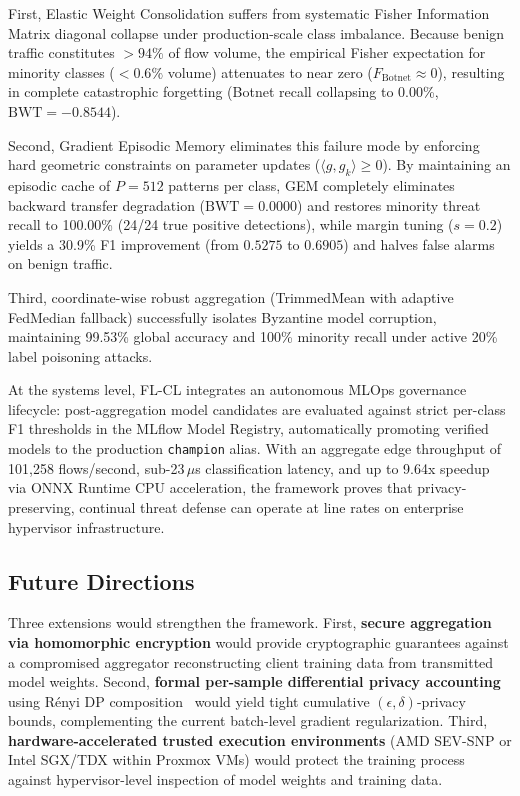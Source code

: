 \documentclass[journal,10pt,twocolumn]{IEEEtran}
\begin{document}
First, Elastic Weight Consolidation suffers from systematic Fisher Information Matrix diagonal collapse under production-scale class imbalance. Because benign traffic constitutes $>94\%$ of flow volume, the empirical Fisher expectation for minority classes ($<0.6\%$ volume) attenuates to near zero ($F_{\text{Botnet}} \approx 0$), resulting in complete catastrophic forgetting (Botnet recall collapsing to 0.00\%, $\text{BWT} = -0.8544$).

Second, Gradient Episodic Memory eliminates this failure mode by enforcing hard geometric constraints on parameter updates ($\langle g, g_k \rangle \ge 0$). By maintaining an episodic cache of $P=512$ patterns per class, GEM completely eliminates backward transfer degradation ($\text{BWT} = 0.0000$) and restores minority threat recall to 100.00\% (24/24 true positive detections), while margin tuning ($s=0.2$) yields a 30.9\% F1 improvement (from $0.5275$ to $0.6905$) and halves false alarms on benign traffic.

Third, coordinate-wise robust aggregation (TrimmedMean with adaptive FedMedian fallback) successfully isolates Byzantine model corruption, maintaining 99.53\% global accuracy and 100\% minority recall under active 20\% label poisoning attacks.

At the systems level, FL-CL integrates an autonomous MLOps governance lifecycle: post-aggregation model candidates are evaluated against strict per-class F1 thresholds in the MLflow Model Registry, automatically promoting verified models to the production \texttt{champion} alias. With an aggregate edge throughput of 101,258 flows/second, sub-23\,$\mu$s classification latency, and up to 9.64x speedup via ONNX Runtime CPU acceleration, the framework proves that privacy-preserving, continual threat defense can operate at line rates on enterprise hypervisor infrastructure.

\subsection{Future Directions}
\label{sec:future}
Three extensions would strengthen the framework. First, \textbf{secure aggregation via homomorphic encryption} would provide cryptographic guarantees against a compromised aggregator reconstructing client training data from transmitted model weights. Second, \textbf{formal per-sample differential privacy accounting} using Rényi DP composition~\cite{abadi2016deep} would yield tight cumulative $(\epsilon, \delta)$-privacy bounds, complementing the current batch-level gradient regularization. Third, \textbf{hardware-accelerated trusted execution environments} (AMD SEV-SNP or Intel SGX/TDX within Proxmox VMs) would protect the training process against hypervisor-level inspection of model weights and training data.



\end{document}
